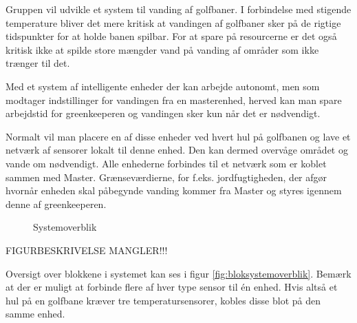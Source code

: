 Gruppen vil udvikle et system til vanding af golfbaner. I forbindelse med stigende temperature bliver det mere kritisk at vandingen af golfbaner sker på de rigtige tidspunkter for at holde banen spilbar. For at spare på resourcerne er det også kritisk ikke at spilde store mængder vand på vanding af områder som ikke trænger til det.

Med et system af intelligente enheder der kan arbejde autonomt, men som modtager indstillinger for vandingen fra en masterenhed, herved kan man spare arbejdstid for greenkeeperen og vandingen sker kun når det er nødvendigt.

Normalt vil man placere en af disse enheder ved hvert hul på golfbanen og lave et netværk af sensorer lokalt til denne enhed. Den kan dermed overvåge området og vande om nødvendigt. Alle enhederne forbindes til et netværk som er koblet sammen med Master. Grænseværdierne, for f.eks. jordfugtigheden, der afgør hvornår enheden skal påbegynde vanding kommer fra Master og styres igennem denne af greenkeeperen. 

\begin{figure}[ht] \centering
{}
\caption{Systemoverblik}
\label{fig:systemoverblik}
\end{figure}

FIGURBESKRIVELSE MANGLER!!!

Oversigt over blokkene i systemet kan ses i figur \ref{fig:bloksystemoverblik}.
Bemærk at der er muligt at forbinde flere af hver type sensor til én enhed. Hvis altså et hul på en golfbane kræver tre temperatursensorer, kobles disse blot på den samme enhed.

